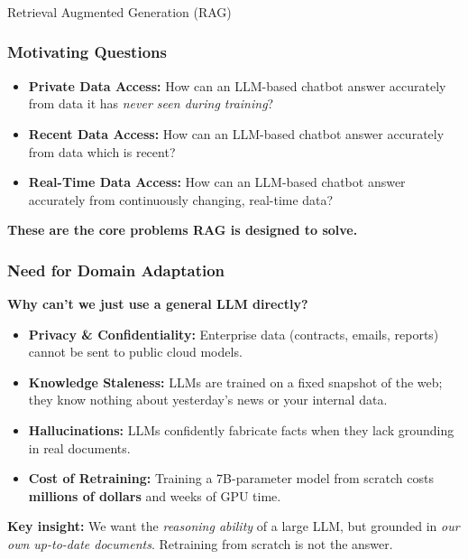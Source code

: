 \begin{frame}[fragile]\frametitle{}
\begin{center}
{\Large Retrieval Augmented Generation (RAG)}
\end{center}
\end{frame}

\begin{frame}[fragile]\frametitle{Motivating Questions}
  \begin{itemize}
    \item \textbf{Private Data Access:} How can an LLM-based chatbot answer accurately from data it has \textit{never seen during training}?
    \item \textbf{Recent Data Access:} How can an LLM-based chatbot answer accurately from data which is recent?
    \item \textbf{Real-Time Data Access:} How can an LLM-based chatbot answer accurately from continuously changing, real-time data?
  \end{itemize}

  \vspace{0.3em}
  \textbf{These are the core problems RAG is designed to solve.}

\end{frame}

\begin{frame}[fragile]\frametitle{Need for Domain Adaptation}

\textbf{Why can't we just use a general LLM directly?}

\begin{itemize}
\item \textbf{Privacy \& Confidentiality:} Enterprise data (contracts, emails, reports) cannot be sent to public cloud models.
\item \textbf{Knowledge Staleness:} LLMs are trained on a fixed snapshot of the web; they know nothing about yesterday's news or your internal data.
\item \textbf{Hallucinations:} LLMs confidently fabricate facts when they lack grounding in real documents.
\item \textbf{Cost of Retraining:} Training a 7B-parameter model from scratch costs \textbf{millions of dollars} and weeks of GPU time.
\end{itemize}

\vspace{0.3em}
\textbf{Key insight:} We want the \textit{reasoning ability} of a large LLM, but grounded in \textit{our own up-to-date documents}. Retraining from scratch is not the answer.

\end{frame}


